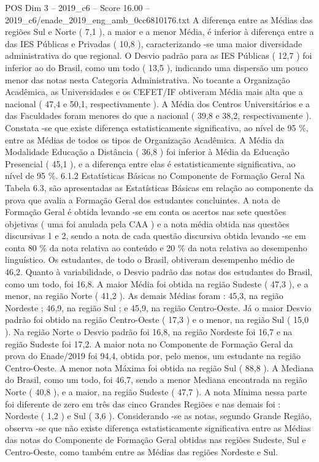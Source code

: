 \begin{textsample}{POS Dim 3 – 2019\_c6 – Score 16.00 – 2019\_c6/enade\_2019\_eng\_amb\_0cc6810176.txt}
A diferença entre as Médias das regiões Sul e Norte ( 7,1 ), a maior e a menor Média, é inferior à diferença entre a das IES Públicas e Privadas ( 10,8 ), caracterizando -se uma maior diversidade administrativa do que regional.
O Desvio padrão para as IES Públicas ( 12,7 ) foi inferior ao do Brasil, como um todo ( 13,5 ), indicando uma dispersão um pouco menor das notas nesta Categoria Administrativa.
No tocante a Organização Acadêmica, as Universidades e os CEFET/IF obtiveram Média mais alta que a nacional ( 47,4 e 50,1, respectivamente ).
A Média dos Centros Universitários e a das Faculdades foram menores do que a nacional ( 39,8 e 38,2, respectivamente ).
Constata -se que existe diferença estatisticamente significativa, ao nível de 95 \%, entre as Médias de todos os tipos de Organização Acadêmica.
A Média da Modalidade Educação a Distância ( 36,8 ) foi inferior à Média da Educação Presencial ( 45,1 ), e a diferença entre elas é estatisticamente significativa, ao nível de 95 \%. 6.1.2 Estatísticas Básicas no Componente de Formação Geral Na Tabela 6.3, são apresentadas as Estatísticas Básicas em relação ao componente da prova que avalia a Formação Geral dos estudantes concluintes.
A nota de Formação Geral é obtida levando -se em conta os acertos nas sete questões objetivas ( uma foi anulada pela CAA ) e a nota média obtida nas questões discursivas 1 e 2, sendo a nota de cada questão discursiva obtida levando -se em conta 80 \% da nota relativa ao conteúdo e 20 \% da nota relativa ao desempenho linguístico.
Os estudantes, de todo o Brasil, obtiveram desempenho médio de 46,2.
Quanto à variabilidade, o Desvio padrão das notas dos estudantes do Brasil, como um todo, foi 16,8.
A maior Média foi obtida na região Sudeste ( 47,3 ), e a menor, na região Norte ( 41,2 ).
As demais Médias foram : 45,3, na região Nordeste ; 46,9, na região Sul ; e 45,9, na região Centro-Oeste.
Já o maior Desvio padrão foi obtido na região Centro-Oeste ( 17,3 ) e o menor, na região Sul ( 15,0 ).
Na região Norte o Desvio padrão foi 16,8, na região Nordeste foi 16,7 e na região Sudeste foi 17,2.
A maior nota no Componente de Formação Geral da prova do Enade/2019 foi 94,4, obtida por, pelo menos, um estudante na região Centro-Oeste.
A menor nota Máxima foi obtida na região Sul ( 88,8 ).
A Mediana do Brasil, como um todo, foi 46,7, sendo a menor Mediana encontrada na região Norte ( 40,8 ), e a maior, na região Sudeste ( 47,7 ).
A nota Mínima nessa parte foi diferente de zero em três das cinco Grandes Regiões e nas demais foi : Nordeste ( 1,2 ) e Sul ( 3,6 ).
Considerando -se as notas, segundo Grande Região, observa -se que não existe diferença estatisticamente significativa entre as Médias das notas do Componente de Formação Geral obtidas nas regiões Sudeste, Sul e Centro-Oeste, como também entre as Médias das regiões Nordeste e Sul.

\end{textsample}
